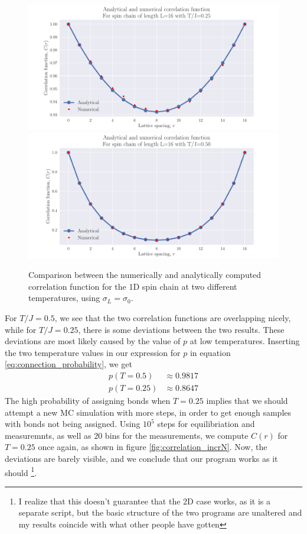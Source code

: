 \documentclass[reprint,english,notitlepage,aps,nobalancelastpage,nofootinbib]{revtex4-1}
\newcommand{\tj}{T/J}
\begin{document}
\begin{figure}[h!]
	\centering
	\includegraphics[width=0.8\linewidth]{correlation1D_025.pdf}
	\includegraphics[width=0.8\linewidth]{correlation1D_05.pdf}
	\caption{Comparison between the numerically and analytically computed correlation function for the 1D spin chain at two different temperatures, using $\sigma_L=\sigma_0$.}
	\label{fig:correlation}
\end{figure}

For $\tj=0.5$, we see that the two correlation functions are overlapping nicely, while for $\tj=0.25$, there is some deviations between the two results. These deviations are most likely caused by the value of $p$ at low temperatures. Inserting the two temperature values in our expression for $p$ in equation \eqref{eq:connection_probability}, we get 
\begin{align*}
	p(T=0.5) &\approx 0.9817 \\ 
	p(T=0.25) &\approx 0.8647 
\end{align*} 
The high probability of assigning bonds when $T=0.25$ implies that we should attempt a new MC simulation with more steps, in order to get enough samples with bonds not being assigned. Using $10^5$ steps for equilibriation and measuremnts, as well as $20$ bins for the measurements, we compute $C(r)$ for $T=0.25$ once again, as shown in figure \ref{fig:correlation_incrN}. Now, the deviations are barely visible, and we conclude that our program works as it should \footnote{I realize that this doesn't guarantee that the 2D case works, as it is a separate script, but the basic structure of the two programs are unaltered and my results coincide with what other people have gotten}.
\end{document}
